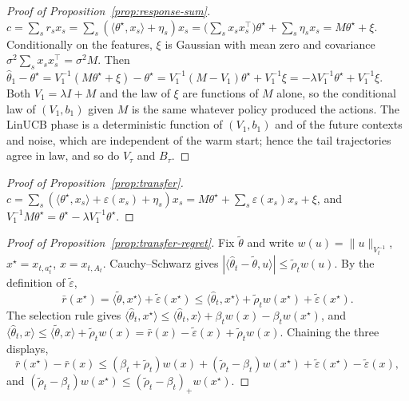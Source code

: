 \documentclass{article}
\theoremstyle{definition}
\theoremstyle{remark}
\theoremstyle{remark}
\newcommand{\wid}{w}
\begin{document}
\begin{proof}[Proof of Proposition~\ref{prop:response-sum}]
$c=\sum_sr_sx_s=\sum_s(\langle\theta^\star,x_s\rangle+\eta_s)x_s
=\bigl(\sum_sx_sx_s^\top\bigr)\theta^\star+\sum_s\eta_sx_s=M\theta^\star+\xi$.
Conditionally on the features, $\xi$ is Gaussian with mean zero and covariance
$\sigma^2\sum_sx_sx_s^\top=\sigma^2M$. Then
$\widehat\theta_1-\theta^\star=V_1^{-1}(M\theta^\star+\xi)-\theta^\star
=V_1^{-1}(M-V_1)\theta^\star+V_1^{-1}\xi=-\lambda V_1^{-1}\theta^\star+V_1^{-1}\xi$.
Both $V_1=\lambda I+M$ and the law of $\xi$ are functions of $M$ alone, so the
conditional law of $(V_1,b_1)$ given $M$ is the same whatever policy produced
the actions. The LinUCB phase is a deterministic function of $(V_1,b_1)$ and of
the future contexts and noise, which are independent of the warm start; hence
the tail trajectories agree in law, and so do $V_\tau$ and $B_\tau$.
\end{proof}

\begin{proof}[Proof of Proposition~\ref{prop:transfer}]
$c=\sum_s(\langle\theta^\star,x_s\rangle+\varepsilon(x_s)+\eta_s)x_s
=M\theta^\star+\sum_s\varepsilon(x_s)x_s+\xi$, and
$V_1^{-1}M\theta^\star=\theta^\star-\lambda V_1^{-1}\theta^\star$.
\end{proof}

\begin{proof}[Proof of Proposition~\ref{prop:transfer-regret}]
Fix $\widetilde\theta$ and write $\wid(u)=\|u\|_{V_t^{-1}}$,
$x^\star=x_{t,a^\star_t}$, $x=x_{t,A_t}$. Cauchy--Schwarz gives
$|\langle\widehat\theta_t-\widetilde\theta,u\rangle|\le\widetilde\rho_t\wid(u)$.
By the definition of $\widetilde\varepsilon$,
\[
\bar r(x^\star)=\langle\widetilde\theta,x^\star\rangle+\widetilde\varepsilon(x^\star)
\le\langle\widehat\theta_t,x^\star\rangle+\widetilde\rho_t\wid(x^\star)+\widetilde\varepsilon(x^\star).
\]
The selection rule gives
$\langle\widehat\theta_t,x^\star\rangle\le\langle\widehat\theta_t,x\rangle+\beta_t\wid(x)-\beta_t\wid(x^\star)$,
and
$\langle\widehat\theta_t,x\rangle\le\langle\widetilde\theta,x\rangle+\widetilde\rho_t\wid(x)
=\bar r(x)-\widetilde\varepsilon(x)+\widetilde\rho_t\wid(x)$.
Chaining the three displays,
\[
\bar r(x^\star)-\bar r(x)\le(\beta_t+\widetilde\rho_t)\wid(x)
+(\widetilde\rho_t-\beta_t)\wid(x^\star)
+\widetilde\varepsilon(x^\star)-\widetilde\varepsilon(x),
\]
and $(\widetilde\rho_t-\beta_t)\wid(x^\star)\le(\widetilde\rho_t-\beta_t)_+\wid(x^\star)$.
\end{proof}
\end{document}
